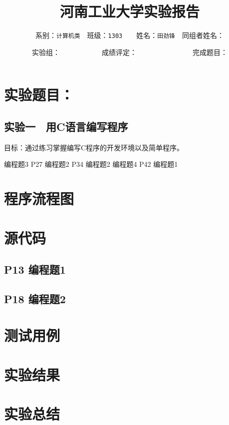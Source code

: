 \documentclass[12pt,a4paper,dvipdfmx]{article}
\begin{document}
\pagestyle{plain}

\title{\bf 河南工业大学实验报告}
\author{系别：{\tt 计算机类}　班级：{\tt 1303}　　姓名：{\tt 田劲锋}　同组者姓名：　　　　　}
  \date{实验组：　　　　　　成绩评定：　　　　　　　　完成题目：　　　　　}
\maketitle

\section{实验题目：}
\subsection*{实验一　用C语言编写程序}
目标：通过练习掌握编写C程序的开发环境以及简单程序。

  编程题3
P27 编程题2 P34 编程题2 编程题4
P42 编程题1

\section{程序流程图}

\section{源代码}

\subsection{P13 编程题1}


\subsection{P18 编程题2}



\section{测试用例}

\section{实验结果}

\section{实验总结}
\end{document}
